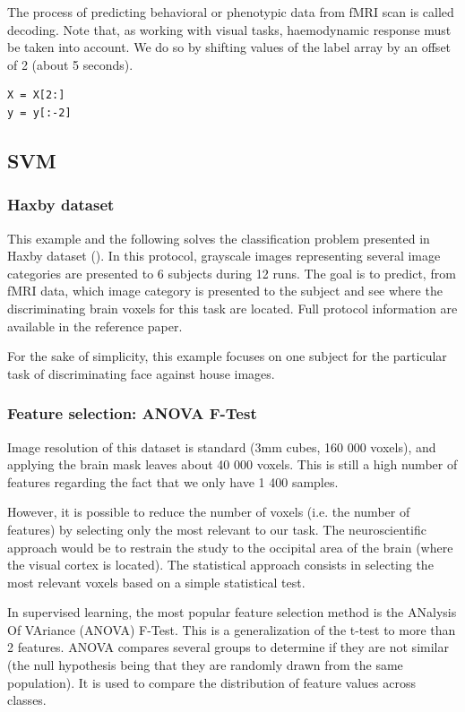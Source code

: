 \documentclass{frontiersSCNS} %
\begin{document}
The process of predicting behavioral or phenotypic data from fMRI scan is
called decoding. Note that, as working with visual tasks, haemodynamic response
must be taken into account. We do so by shifting values of the label
array by an offset of 2 (about 5 seconds).

\begin{lstlisting}
X = X[2:]
y = y[:-2]
\end{lstlisting}

\subsection{SVM}

\subsubsection{Haxby dataset}

This example and the following solves the classification problem presented in
Haxby dataset (\cite{haxby2001}). In this protocol, grayscale images
representing several image categories are presented to 6 subjects during 12
runs. The goal is to predict, from fMRI data, which image category is presented
to the subject and see where the discriminating brain voxels for this task are
located. Full protocol information are available in the reference paper.

For the sake of simplicity, this example focuses on one subject for the
particular task of discriminating face against house images.

\subsubsection{Feature selection: ANOVA F-Test}

Image resolution of this dataset is standard (3mm cubes, 160 000 voxels),
and applying the brain mask leaves about 40 000 voxels. This is still a
high number of features regarding the fact that we only have 1 400 samples.

However, it is possible to reduce the number of voxels (i.e. the number of
features) by selecting only the most relevant to our task. The neuroscientific
approach would be to restrain the study to the occipital area of the brain
(where the visual cortex is located). The statistical approach consists in
selecting the most relevant voxels based on a simple statistical test.

In supervised learning, the most popular feature selection method is the
ANalysis Of VAriance (ANOVA) F-Test. This is a generalization of the t-test to
more than 2 features. ANOVA compares several
groups to determine if they are not similar (the null hypothesis being that they
are randomly drawn from the same population). It is used to compare the distribution
of feature values across classes.
\end{document}
